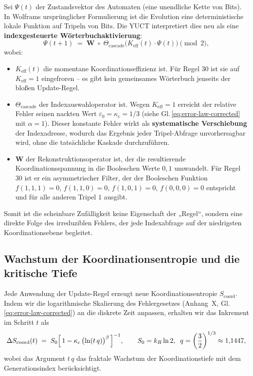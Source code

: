 \documentclass[12pt,a4paper]{article}
\newcommand{\Keff}{K_{\mathrm{eff}}}
\begin{document}
	Sei \(\Psi(t)\) der Zustandsvektor des Automaten (eine unendliche Kette von Bits). In Wolframs ursprünglicher Formulierung ist die Evolution eine deterministische lokale Funktion auf Tripeln von Bits. Die YUCT interpretiert dies neu als eine \textbf{indexgesteuerte Wörterbuchaktivierung}:
	\begin{equation}
		\Psi(t+1) \;=\; \mathbf{W}\;\circ\;
		\Theta_{\mathrm{cascade}}\!\bigl(\Keff(t)\cdot\Psi(t)\bigr)
		\pmod{2},
		\label{eq:rule30-ypsdc}
	\end{equation}
	wobei:
	\begin{itemize}
		\item \(\Keff(t)\) die momentane Koordinationseffizienz ist. Für Regel 30 ist sie auf \(\Keff = 1\) eingefroren – es gibt kein gemeinsames Wörterbuch jenseits der bloßen Update-Regel.
		\item \(\Theta_{\mathrm{cascade}}\) der Indexauswahloperator ist. Wegen \(\Keff=1\) erreicht der relative Fehler seinen nackten Wert \(\varepsilon_0 = \kappa_c = 1/3\) (siehe Gl.\,\eqref{eq:error-law-corrected} mit \(\alpha=1\)). Dieser konstante Fehler wirkt als \textbf{systematische Verschiebung} der Indexadresse, wodurch das Ergebnis jeder Tripel-Abfrage unvorhersagbar wird, ohne die tatsächliche Kaskade durchzuführen.
		\item \(\mathbf{W}\) der Rekonstruktionsoperator ist, der die resultierende Koordinationsspannung in die Booleschen Werte \(0,1\) umwandelt. Für Regel 30 ist er ein asymmetrischer Filter, der der Booleschen Funktion \(f(1,1,1)=0\), \(f(1,1,0)=0\), \(f(1,0,1)=0\), \(f(0,0,0)=0\) entspricht und für alle anderen Tripel \(1\) ausgibt.
	\end{itemize}
	Somit ist die scheinbare Zufälligkeit keine Eigenschaft der „Regel“, sondern eine direkte Folge des irreduziblen Fehlers, der jede Indexabfrage auf der niedrigsten Koordinationsebene begleitet.
	
	\subsection{Wachstum der Koordinationsentropie und die kritische Tiefe}
	\label{subsec:entropy-growth}
	
	Jede Anwendung der Update-Regel erzeugt neue Koordinationsentropie \(S_{\mathrm{coord}}\). Indem wir die logarithmische Skalierung des Fehlergesetzes (Anhang~X, Gl.\,\eqref{eq:error-law-corrected}) an die diskrete Zeit anpassen, erhalten wir das Inkrement im Schritt \(t\) als
	\begin{equation}
		\Delta S_{\mathrm{coord}}(t) \;=\;
		S_{0}\Bigl[\,1 - \kappa_c\,\bigl(\ln(t\,q)\bigr)^{\beta}\,\Bigr]^{-1},
		\qquad
		S_{0}=k_{B}\ln 2,\;\;
		q = \left(\frac{3}{2}\right)^{1/3}\approx 1{,}1447,
		\label{eq:deltaS}
	\end{equation}
	wobei das Argument \(t\,q\) das fraktale Wachstum der Koordinationstiefe mit dem Generationsindex berücksichtigt.
	
\end{document}
